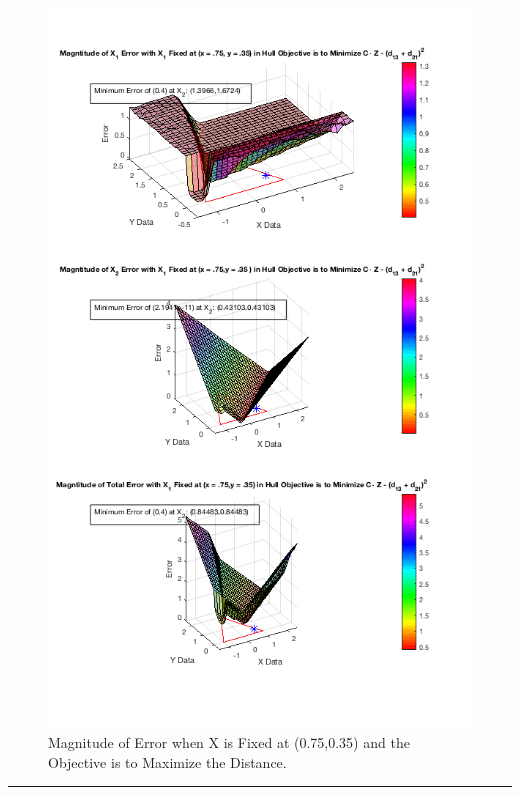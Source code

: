 \documentclass[answers]{exam}
\begin{document}
        \begin{figure}[H]
    \centering
    
        \caption{Magnitude of Error when X is Fixed at (0.75,0.35) and the Objective is to Maximize the Distance.}
    \includegraphics[scale=.7]{Problem8f8.png}
    \end{figure} 
    
    \rule{\textwidth}{1pt}
\end{document}
